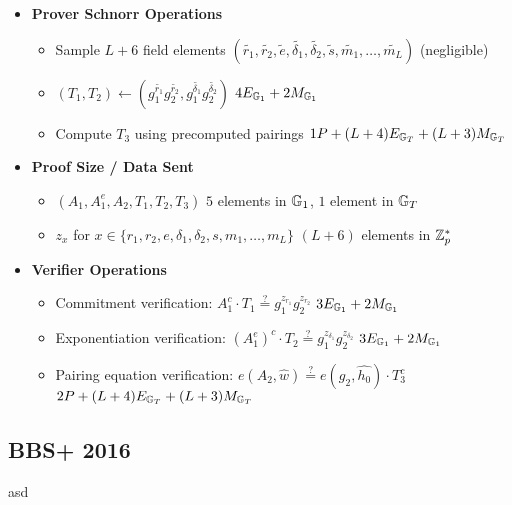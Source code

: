 {\begin{itemize}
    \item \textbf{Prover Schnorr Operations}
    \begin{itemize}
        \item Sample $L+6$ field elements $(\tilde{r_1}, \tilde{r_2}, \tilde{e}, \tilde{\delta_1}, \tilde{\delta_2}, \tilde{s}, \tilde{m_1},\ldots,\tilde{m_L})$ \qquad (negligible)
        \item $(T_1, T_2) \gets (g_1^{\tilde{r_1}}g_2^{\tilde{r_2}}, g_1^{\tilde{\delta_1}}g_2^{\tilde{\delta_2}})$ \qquad $4E_{\mathbb{G}_1} + 2M_{\mathbb{G}_1}$
        \item Compute $T_3$ using precomputed pairings \qquad $1P + (L+4)E_{\mathbb{G}_T} + (L+3)M_{\mathbb{G}_T}$
    \end{itemize}
    
    \item \textbf{Proof Size / Data Sent}
    \begin{itemize}
        \item $(A_1, A_1^e, A_2, T_1, T_2, T_3)$ \qquad $5$ elements in $\mathbb{G}_1$, $1$ element in $\mathbb{G}_T$
        \item $z_x$ for $x \in \{r_1, r_2, e, \delta_1, \delta_2, s, m_1,\ldots,m_L\}$ \qquad $(L+6)$ elements in $\mathbb{Z}_p^*$
    \end{itemize}
    
    \item \textbf{Verifier Operations}
    \begin{itemize}
        \item Commitment verification: $A_1^c \cdot T_1 \stackrel{?}{=} g_1^{z_{r_1}}g_2^{z_{r_2}}$ \qquad $3E_{\mathbb{G}_1} + 2M_{\mathbb{G}_1}$
        \item Exponentiation verification: $(A_1^e)^c \cdot T_2 \stackrel{?}{=} g_1^{z_{\delta_1}}g_2^{z_{\delta_2}}$ \qquad $3E_{\mathbb{G}_1} + 2M_{\mathbb{G}_1}$
        \item Pairing equation verification: $e(A_2, \widehat{w}) \stackrel{?}{=} e(g_2, \widehat{h_0}) \cdot T_3^c$ \qquad $2P + (L+4)E_{\mathbb{G}_T} + (L+3)M_{\mathbb{G}_T}$
    \end{itemize}
\end{itemize}



% 
% 



\newpage
\subsection{BBS+ 2016 \cite{camenisch_anonymous_2016}}
asd
}
